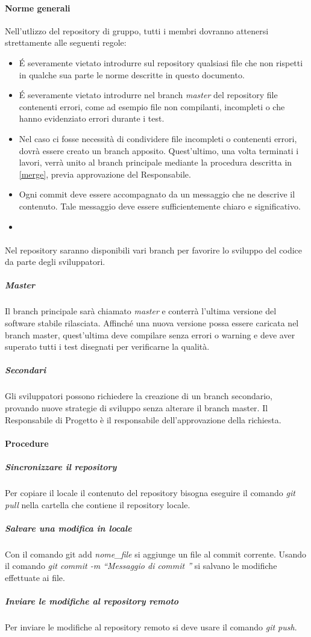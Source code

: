 \paragraph{Norme generali}
Nell'utlizzo del repository di gruppo, tutti i membri dovranno attenersi strettamente alle seguenti regole:
\begin{itemize}
\item \'E severamente vietato introdurre sul repository qualsiasi file che non rispetti in qualche sua parte le norme descritte in questo documento.
\item \'E severamente vietato introdurre nel branch \textit{master} del repository file contenenti errori, come ad esempio file non compilanti, incompleti o che hanno evidenziato errori durante i test.
\item Nel caso ci fosse necessità di condividere file incompleti o contenenti errori, dovrà essere creato un branch apposito. Quest'ultimo, una volta terminati i lavori, verrà unito al branch principale mediante la procedura descritta in \ref{merge}, previa approvazione del Responsabile.
\item Ogni commit deve essere accompagnato da un messaggio che ne descrive il contenuto. Tale messaggio deve essere sufficientemente chiaro e significativo.
\item 
\end{itemize}


\paragraph{}
\label{4.4}
Nel repository saranno disponibili vari branch per favorire lo sviluppo del codice da parte degli sviluppatori.

\subparagraph{Master}
\label{4.4.1}
Il branch principale sarà chiamato \textit{master} e conterrà l'ultima versione del software stabile rilasciata. Affinché una nuova versione possa essere caricata nel branch master, quest'ultima deve compilare senza errori o warning e deve aver superato tutti i test disegnati per verificarne la qualità.

\subparagraph{Secondari}
\label{4.4.2}
Gli sviluppatori possono richiedere la creazione di un branch secondario, provando nuove strategie di sviluppo senza alterare il branch master. Il Responsabile di Progetto è il responsabile dell'approvazione della richiesta.

\paragraph{Procedure}
\subparagraph{Sincronizzare il repository}
Per copiare il locale il contenuto del repository bisogna eseguire il comando \textit{git pull} nella cartella che contiene il repository locale.
\subparagraph{Salvare una modifica in locale}
Con il comando git add \textit{nome\_file} si aggiunge un file al commit corrente. Usando il comando \textit{git commit -m “Messaggio di commit ”} si salvano le modifiche effettuate ai file.
\subparagraph{Inviare le modifiche al repository remoto}
Per inviare le modifiche al repository remoto si deve usare il comando \textit{git push}.

